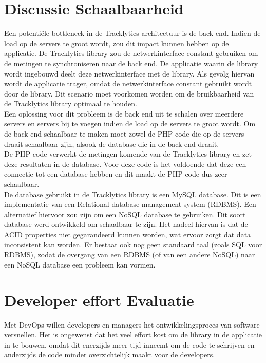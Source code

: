 \section{Discussie Schaalbaarheid} \label{schaalbaarheid}
Een potenti\"ele bottleneck in de Tracklytics architectuur is de back end. Indien de load op de servers te groot wordt, zou dit impact kunnen hebben op de applicatie. De Tracklytics library zou de netwerkinterface constant gebruiken om de metingen te synchroniseren naar de back end. De applicatie waarin de library wordt ingebouwd deelt deze netwerkinterface met de library. Als gevolg hiervan wordt de applicatie trager, omdat de netwerkinterface constant gebruikt wordt door de library. Dit scenario moet voorkomen worden om de bruikbaarheid van de Tracklytics library optimaal te houden.\\

Een oplossing voor dit probleem is de back end uit te schalen over meerdere servers en servers bij te voegen indien de load op de servers te groot wordt. Om de back end schaalbaar te maken moet zowel de PHP code die op de servers draait schaalbaar zijn, alsook de database die in de back end draait. \\

De PHP code verwerkt de metingen komende van de Tracklytics library en zet deze resultaten in de database. Voor deze code is het voldoende dat deze een connectie tot een database hebben en dit maakt de PHP code dus zeer schaalbaar.\\

De database gebruikt in de Tracklytics library is een MySQL database. Dit is een implementatie van een Relational database management system (RDBMS). Een alternatief hiervoor zou zijn om een NoSQL database te gebruiken. Dit soort database werd ontwikkeld om schaalbaar te zijn. Het nadeel hiervan is dat de ACID properties niet gegarandeerd kunnen worden, wat ervoor zorgt dat data inconsistent kan worden. Er bestaat ook nog geen standaard taal (zoals SQL voor RDBMS), zodat de overgang van een RDBMS (of van een andere NoSQL) naar een NoSQL database een probleem kan vormen. \\


\section{Developer effort Evaluatie}\label{Section:Effort}
Met DevOps willen developers en managers het ontwikkelingsproces van software versnellen. Het is ongewenst dat het veel effort kost om de library in de applicatie in te bouwen, omdat dit enerzijds meer tijd inneemt om de code te schrijven en anderzijds de code minder overzichtelijk maakt voor de developers. \\

